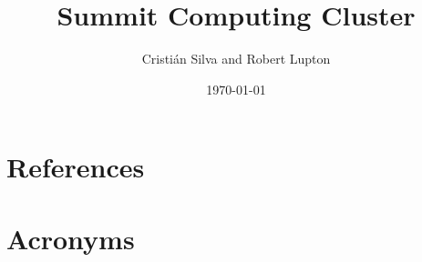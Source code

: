 \documentclass[PMO,authoryear,lsstdraft,toc]{lsstdoc}
\title{Summit Computing Cluster}
\author{%
  Cristi\'an Silva
and
  Robert Lupton
}
\date {\today}
\begin{document}
\maketitle






\appendix
\section{References} \label{sec:bib}
\renewcommand{\refname}{} %


\section{Acronyms} \label{sec:acronyms}

\end{document}
